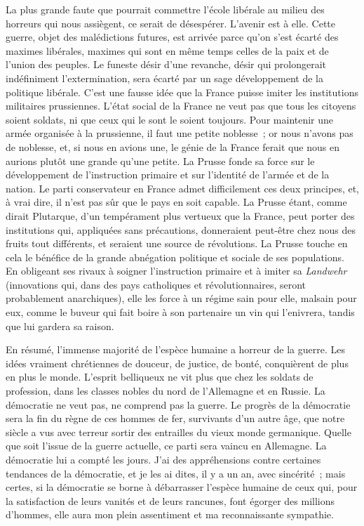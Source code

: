 \documentclass[french,twoside]{book} %
\begin{document}
La plus grande faute que pourrait commettre l’école libérale au milieu des horreurs qui nous assiègent, ce serait de désespérer. L’avenir est à elle. Cette guerre, objet des malédictions futures, est arrivée parce qu’on s’est écarté des maximes libérales, maximes qui sont en même temps celles de la paix et de l’union des peuples. Le funeste désir d’une revanche, désir qui prolongerait indéfiniment l’extermination, sera écarté par un sage développement de la politique libérale. C’est une fausse idée que la France puisse imiter les institutions militaires prussiennes. L’état social de la France ne veut pas que tous les citoyens soient soldats, ni que ceux qui le sont le soient toujours. Pour maintenir une armée organisée à la prussienne, il faut une petite noblesse ; or nous n’avons pas de noblesse, et, si nous en avions une, le génie de la France ferait que nous en aurions plutôt une grande qu’une petite. La Prusse fonde sa force sur le développement de l’instruction primaire et sur l’identité de l’armée et de la nation. Le parti conservateur en France admet difficilement ces deux principes, et, à vrai dire, il n’est pas sûr que le pays en soit capable. La Prusse étant, comme dirait Plutarque, d’un tempérament plus vertueux que la France, peut porter des institutions qui, appliquées sans précautions, donneraient peut-être chez nous des fruits tout différents, et seraient une source de révolutions. La Prusse touche en cela le bénéfice de la grande abnégation politique et sociale de ses populations. En obligeant ses rivaux à soigner l’instruction primaire et à imiter sa {\itshape Landwehr} (innovations qui, dans des pays catholiques et révolutionnaires, seront probablement anarchiques), elle les force à un régime sain pour elle, malsain pour eux, comme le buveur qui fait boire à son partenaire un vin qui l’enivrera, tandis que lui gardera sa raison.\par
En résumé, l’immense majorité de l’espèce humaine a horreur de la guerre. Les idées vraiment chrétiennes de douceur, de justice, de bonté, conquièrent de plus en plus le monde. L’esprit belliqueux ne vit plus que chez les soldats de profession, dans les classes nobles du nord de l’Allemagne et en Russie. La démocratie ne veut pas, ne comprend pas la guerre. Le progrès de la démocratie sera la fin du règne de ces hommes de fer, survivants d’un autre âge, que notre siècle a vus avec terreur sortir des entrailles du vieux monde germanique. Quelle que soit l’issue de la guerre actuelle, ce parti sera vaincu en Allemagne. La démocratie lui a compté les jours. J’ai des appréhensions contre certaines tendances de la démocratie, et je les ai dites, il y a un an, avec sincérité ; mais certes, si la démocratie se borne à débarrasser l’espèce humaine de ceux qui, pour la satisfaction de leurs vanités et de leurs rancunes, font égorger des millions d’hommes, elle aura mon plein assentiment et ma reconnaissante sympathie.\par
\end{document}
